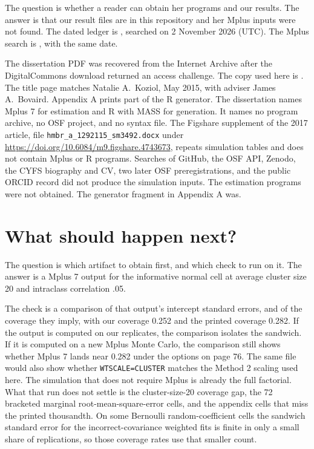 The question is whether a reader can obtain her programs and our results.
The answer is that our result files are in this repository and her Mplus
inputs were not found.
The dated ledger is , searched on 2 November 2026
(UTC).
The Mplus search is , with the same date.

The dissertation PDF was recovered from the Internet Archive after the
DigitalCommons download returned an access challenge.
The copy used here is .
The title page matches Natalie A.\ Koziol, May 2015, with adviser James A.\
Bovaird.
Appendix A prints part of the R generator.
The dissertation names Mplus 7 for estimation and R with MASS for generation.
It names no program archive, no OSF project, and no syntax file.
The Figshare supplement of the 2017 article, file
\texttt{hmbr\_a\_1292115\_sm3492.docx} under
\url{https://doi.org/10.6084/m9.figshare.4743673}, repeats simulation tables and
does not contain Mplus or R programs.
Searches of GitHub, the OSF API, Zenodo, the CYFS biography and CV, two later
OSF preregistrations, and the public ORCID record did not produce the
simulation inputs.
The estimation programs were not obtained.
The generator fragment in Appendix A was.

\section{What should happen next?}

The question is which artifact to obtain first, and which check to run on it.
The answer is a Mplus 7 output for the informative normal cell at average
cluster size 20 and intraclass correlation .05.

The check is a comparison of that output's intercept standard errors, and of
the coverage they imply, with our coverage 0.252 and the printed coverage
0.282.
If the output is computed on our replicates, the comparison isolates the
sandwich.
If it is computed on a new Mplus Monte Carlo, the comparison still shows
whether Mplus 7 lands near 0.282 under the options on page 76.
The same file would also show whether \texttt{WTSCALE=CLUSTER} matches the
Method 2 scaling used here.
The simulation that does not require Mplus is already the full factorial.
What that run does not settle is the cluster-size-20 coverage gap, the 72
bracketed marginal root-mean-square-error cells, and the appendix cells that
miss the printed thousandth.
On some Bernoulli random-coefficient cells the sandwich standard error for
the incorrect-covariance weighted fits is finite in only a small share of
replications, so those coverage rates use that smaller count.

